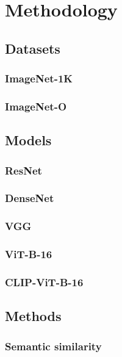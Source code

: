 \chapter{Methodology}
\label{chapt:Methodology}

\section{Datasets}

\subsection{ImageNet-1K}

\subsection{ImageNet-O}

\section{Models}


\subsection{ResNet}
\subsection{DenseNet}
\subsection{VGG}
\subsection{ViT-B-16}
\subsection{CLIP-ViT-B-16}

\section{Methods}

\subsection{Semantic similarity}
